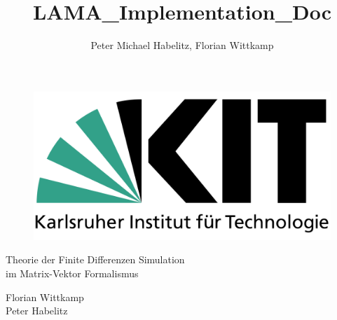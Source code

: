 \documentclass[pdftex,a4paper,parskip,listof=totoc,bibliography=totoc,onehalfspacing,12pt]{scrreprt}
\title{LAMA_Implementation_Doc}
\author{Peter Michael Habelitz, Florian Wittkamp}
\begin{document}


\thispagestyle{empty} %
\begin{figure}[h] %
\begin{flushright}
\includegraphics[scale=0.06]{./images/kit_logo.png}
\end{flushright}
\end{figure}

\begin{center}
\Large{Theorie der Finite Differenzen Simulation\\ im Matrix-Vektor Formalismus}\\
\vspace{0.5cm}

\end{center}

\vfill

\begin{center}
Florian Wittkamp\\
Peter Habelitz
\end{center}

\newpage 
\thispagestyle{empty}
\quad 
\newpage

\setcounter{page}{1}
\restoregeometry


\newpage

\tableofcontents %

\pagebreak
\thispagestyle{plain}
\end{document}
